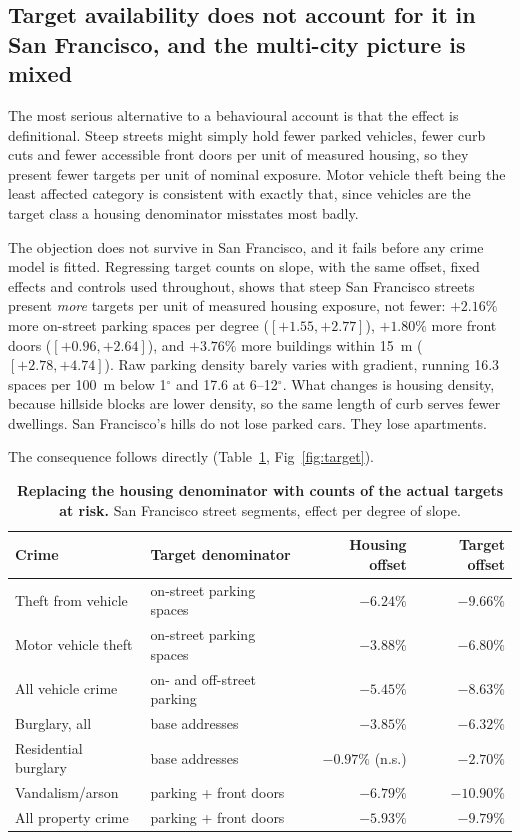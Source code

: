 \documentclass[10pt,letterpaper]{article}
\begin{document}
\subsection*{Target availability does not account for it in San Francisco, and the multi-city picture is mixed}

The most serious alternative to a behavioural account is that the effect is
definitional. Steep streets might simply hold fewer parked vehicles, fewer curb cuts
and fewer accessible front doors per unit of measured housing, so they present fewer
targets per unit of nominal exposure. Motor vehicle theft being the least affected
category is consistent with exactly that, since vehicles are the target class a
housing denominator misstates most badly.

The objection does not survive in San Francisco, and it fails before any crime model
is fitted. Regressing target counts on
slope, with the same offset, fixed effects and controls used throughout, shows that
steep San Francisco streets present \emph{more} targets per unit of measured housing
exposure, not fewer: $+2.16\%$ more on-street parking spaces per degree
($[+1.55, +2.77]$), $+1.80\%$ more front doors ($[+0.96, +2.64]$), and $+3.76\%$ more
buildings within 15~m ($[+2.78, +4.74]$). Raw parking density barely varies with
gradient, running 16.3 spaces per 100~m below 1$^\circ$ and 17.6 at 6--12$^\circ$.
What changes is housing density, because hillside blocks are lower density, so the
same length of curb serves fewer dwellings. San Francisco's hills do not lose parked
cars. They lose apartments.

The consequence follows directly (Table~\ref{tab:target}, Fig~\ref{fig:target}).

\begin{table}[!ht]
\centering
\caption{{\bf Replacing the housing denominator with counts of the actual targets at
risk.} San Francisco street segments, effect per degree of slope.}
\label{tab:target}
\begin{tabular}{llrr}
\toprule
Crime & Target denominator & Housing offset & Target offset \\
\midrule
Theft from vehicle & on-street parking spaces & $-6.24\%$ & $-9.66\%$ \\
Motor vehicle theft & on-street parking spaces & $-3.88\%$ & $-6.80\%$ \\
All vehicle crime & on- and off-street parking & $-5.45\%$ & $-8.63\%$ \\
Burglary, all & base addresses & $-3.85\%$ & $-6.32\%$ \\
Residential burglary & base addresses & $-0.97\%$ (n.s.) & $-2.70\%$ \\
Vandalism/arson & parking + front doors & $-6.79\%$ & $-10.90\%$ \\
All property crime & parking + front doors & $-5.93\%$ & $-9.79\%$ \\
\bottomrule
\end{tabular}
\end{table}
\end{document}
